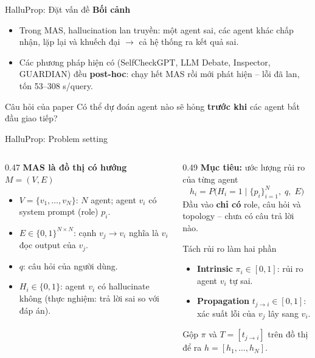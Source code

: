 \documentclass[aspectratio=169,10pt]{beamer}
\begin{document}
\begin{frame}{HalluProp: Đặt vấn đề}
  \textbf{Bối cảnh}
  \begin{itemize}
    \item Trong MAS, hallucination \alert{lan truyền}: một agent sai, các agent khác
      chấp nhận, lặp lại và khuếch đại $\to$ cả hệ thống ra kết quả sai.
    \item Các phương pháp hiện có (SelfCheckGPT, LLM Debate, Inspector, GUARDIAN) đều
      \textbf{post-hoc}: chạy hết MAS rồi mới phát hiện -- lỗi đã lan, tốn 53--308 s/query.
  \end{itemize}
  \vspace{6pt}
  \begin{block}{Câu hỏi của paper}
    Có thể dự đoán agent nào sẽ hỏng \textbf{trước khi} các agent bắt đầu giao tiếp?
  \end{block}
\end{frame}

\begin{frame}{HalluProp: Problem setting}
  \small
  \begin{columns}[T]
    \begin{column}{0.47\textwidth}
      \textbf{MAS là đồ thị có hướng} $M = (V, E)$
      \begin{itemize}
        \item $V = \{v_1, \dots, v_N\}$: $N$ agent; agent $v_i$ có system prompt (role) $p_i$.
        \item $E \in \{0,1\}^{N \times N}$: cạnh $v_j \to v_i$ nghĩa là $v_i$ đọc output của $v_j$.
        \item $q$: câu hỏi của người dùng.
        \item $H_i \in \{0,1\}$: agent $v_i$ có hallucinate không
          (thực nghiệm: trả lời sai so với đáp án).
      \end{itemize}
    \end{column}
    \begin{column}{0.49\textwidth}
      \textbf{Mục tiêu:} ước lượng rủi ro của từng agent
      \[ h_i = P\bigl(H_i = 1 \mid \{p_i\}_{i=1}^N,\; q,\; E\bigr) \]
      Đầu vào \textbf{chỉ có} role, câu hỏi và topology -- chưa có câu trả lời nào.
      \begin{block}{Tách rủi ro làm hai phần}
        \begin{itemize}
          \item \textbf{Intrinsic} $\pi_i \in [0,1]$: rủi ro agent $v_i$ tự sai.
          \item \textbf{Propagation} $t_{j\to i} \in [0,1]$: xác suất lỗi của $v_j$ lây sang $v_i$.
        \end{itemize}
        Gộp $\pi$ và $T = [t_{j\to i}]$ trên đồ thị để ra $h = [h_1, \dots, h_N]$.
      \end{block}
    \end{column}
  \end{columns}
\end{frame}
\end{document}

